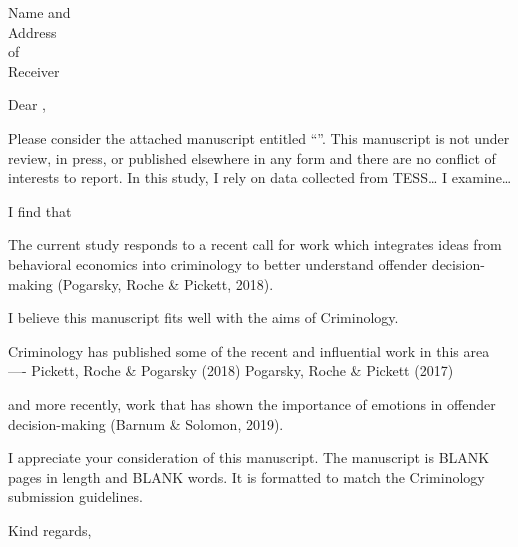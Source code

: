 \documentclass[a4paper,12pt]{letter}
\begin{document}
\begin{letter}{Name and \\ Address \\ of \\ Receiver}

\opening{} %

Dear , 

Please consider the attached manuscript entitled “”. This manuscript is not under review, in press, or published elsewhere in any form and there are no conflict of interests to report.
In this study, I rely on data collected from TESS… I examine… 

I find that 

The current study responds to a recent call for work which integrates ideas from behavioral economics into criminology to better understand offender decision-making (Pogarsky, Roche \& Pickett, 2018).

I believe this manuscript fits well with the aims of Criminology. 

Criminology has published some of the recent and influential work in this area ---- 
Pickett, Roche \& Pogarsky (2018)
Pogarsky, Roche \& Pickett (2017)

and more recently, work that has shown the importance of emotions in offender decision-making (Barnum \& Solomon, 2019). 


I appreciate your consideration of this manuscript. The manuscript is BLANK pages in length and BLANK words. It is formatted to match the Criminology submission guidelines. 


\closing{Kind regards,} %



\end{letter}
\end{document}
